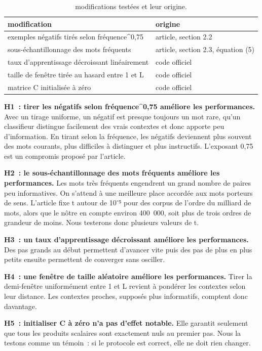 \documentclass[11pt,a4paper]{article}
\begin{document}
\begin{table}[!htbp]
\centering
\small
\caption{modifications testées et leur origine.}
\begin{tabular}{ll}
\toprule
\textbf{modification} & \textbf{origine} \\
\midrule
exemples négatifs tirés selon fréquence\textasciicircum{}0,75 & article, section 2.2 \\
sous-échantillonnage des mots fréquents & article, section 2.3, équation (5) \\
taux d’apprentissage décroissant linéairement & code officiel \\
taille de fenêtre tirée au hasard entre 1 et L & code officiel \\
matrice C initialisée à zéro & code officiel \\
\bottomrule
\end{tabular}
\end{table}

\textbf{H1~: tirer les négatifs selon fréquence\textasciicircum{}0,75 améliore les performances.} Avec un tirage uniforme, un négatif est presque toujours un mot rare, qu’un classifieur distingue facilement des vrais contextes et donc apporte peu d’information. En tirant selon la fréquence, les négatifs deviennent plus souvent des mots courants, plus difficiles à distinguer et plus instructifs. L’exposant 0,75 est un compromis proposé par l’article.

\textbf{H2~: le sous-échantillonnage des mots fréquents améliore les performances.} Les mots très fréquents engendrent un grand nombre de paires peu informatives. On s’attend à une meilleure place accordée aux mots porteurs de sens. L’article fixe t autour de 10⁻⁵ pour des corpus de l’ordre du milliard de mots, alors que le nôtre en compte environ 400~000, soit plus de trois ordres de grandeur de moins. Nous testerons donc plusieurs valeurs de t.

\textbf{H3~: un taux d’apprentissage décroissant améliore les performances.} Des pas grands au début permettent d’avancer vite puis des pas de plus en plus petits ensuite permettent de converger sans osciller.

\textbf{H4~: une fenêtre de taille aléatoire améliore les performances.} Tirer la demi-fenêtre uniformément entre 1 et L revient à pondérer les contextes selon leur distance. Les contextes proches, supposés plus informatifs, comptent donc davantage.

\textbf{H5~: initialiser C à zéro n’a pas d’effet notable.} Elle garantit seulement que tous les produits scalaires sont exactement nuls au premier pas. Nous la testons comme un témoin~: si le protocole est correct, elle ne doit rien changer.
\end{document}
